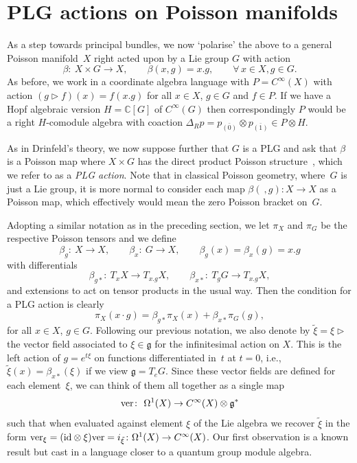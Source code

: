 \documentclass[pdftex]{sigma}
\numberwithin{equation}{section}
\newcommand{\C}{{\mathbb{C}}}
\newcommand{\<}{{\langle}}
\renewcommand{\>}{{\rangle}}
\newcommand{\tens}{\otimes}
\newcommand{\id}{{\rm id}}
\newcommand{\co}{{}_{\scriptstyle \bar{(1)}}}
\newcommand{\rz}{{}_{\scriptstyle \bar{(0)}}}
\newcommand{\la}{{\triangleright}}
\newcommand{\cg}{{\mathfrak{g}}}
\newcommand{\ver}{{\rm ver}}
\begin{document}
\section{PLG actions on Poisson manifolds}\label{PLGact}

As a step towards principal bundles, we now `polarise' the above to a general Poisson mani\-fold~$X$ right acted upon by a Lie group $G$ with action
\[ \beta\colon \ X\times G\to X,\qquad \beta(x,g)=x.g,\qquad\forall\, x\in X, g\in G.\]
As before, we work in a coordinate algebra language with $P=C^\infty(X)$ with action $(g\la f)(x)=f(x.g)$ for all $x\in X$, $g\in G$ and $f\in P$. If we have a Hopf algebraic version $H=\C[G]$ of $C^\infty(G)$ then correspondingly $P$ would be a right $H$-comodule algebra with coaction $\Delta_Rp=p\rz\tens p\co\in P\tens H$.

As in Drinfeld's theory, we now suppose further that $G$ is a PLG and ask that $\beta$ is a Poisson map where $X\times G$ has the direct product Poisson structure~\cite{Lu}, which we refer to as a {\em PLG action}. Note that in classical Poisson geometry, where~$G$ is just a Lie group, it is more normal to consider each map $\beta(\ ,g)\colon X\to X$ as a Poisson map, which effectively would mean the zero Poisson bracket on~$G$.

Adopting a similar notation as in the preceding section, we let $\pi_X$ and $\pi_G$ be the respective Poisson tensors and we define
\[ \beta_g\colon \ X\to X,\qquad \beta_x\colon \ G\to X,\qquad \beta_g(x)=\beta_x(g)=x.g\]
with differentials
\[ \beta_{g*}\colon \ T_xX\rightarrow T_{x.g}X, \qquad \beta_{x*}\colon \ T_gG\rightarrow T_{x.g}X, \]
and extensions to act on tensor products in the usual way. Then the condition for a PLG action is clearly
\begin{equation*}%
\pi_X(x\cdot g)=\beta_{g*}\pi_X(x)+\beta_{x*}\pi_G(g), \end{equation*}
for all $x\in X$, $g\in G$. Following our previous notation, we also denote by $\tilde\xi=\xi\la$ the vector field associated to $\xi\in\cg$ for the infinitesimal action on $X$. This is the left action of $g=e^{t\xi}$ on functions differentiated in~$t$ at $t=0$, i.e., $\tilde\xi(x)=\beta_{x*}(\xi)$ if we view $\cg=T_eG$. Since these vector fields are defined for each element~$\xi$, we can think of them all together as a single map
\begin{equation*}%
\ver\colon \ \Omega^1(X)\rightarrow C^{\infty}(X)\tens\mathfrak{g}^*\end{equation*} such that when evaluated against element $\xi$ of the Lie algebra we recover $\tilde\xi$ in the form $\ver_\xi=(\id\tens\xi)\ver=i_{\tilde\xi}\colon \Omega^1(X)\to C^\infty(X)$. Our first observation is a known result but cast in a language closer to a quantum group module algebra.
\end{document}

